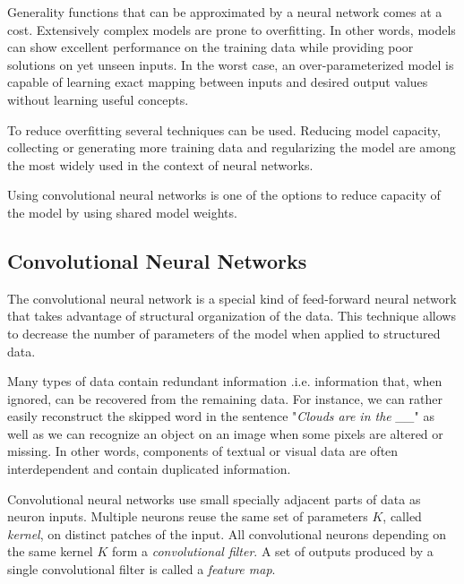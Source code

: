 Generality functions that can be approximated by a neural network comes at a cost.
Extensively complex models are prone to overfitting. In other words, models can show excellent performance on the training data while providing poor solutions on yet unseen inputs. In the worst case, an over-parameterized model is capable of learning exact mapping between inputs and desired output values without learning useful concepts.

To reduce overfitting several techniques can be used. Reducing model capacity, collecting or generating more training data and regularizing the model are among the most widely used in the context of neural networks.

Using convolutional neural networks is one of the options to reduce capacity of the model by using shared model weights.




\subsection{Convolutional Neural Networks}
\label{ch:cnn}

The convolutional neural network is a special kind of feed-forward neural network that takes advantage of structural organization of the data. This technique allows to decrease the number of parameters of the model when applied to structured data.

Many types of data contain redundant information .i.e. information that, when ignored, can be recovered from the remaining data.
For instance, we can rather easily reconstruct the skipped word in the sentence "\textit{Clouds are in the \_\_}" as well as we can recognize an object on an image when some pixels are altered or missing.
In other words, components of textual or visual data are often interdependent and contain duplicated information.

Convolutional neural networks use small specially adjacent parts of data as neuron inputs. Multiple neurons reuse the same set of parameters $K$, called \textit{kernel}, on distinct patches of the input. All convolutional neurons depending on the same kernel $K$ form a \textit{convolutional filter}. A set of outputs produced by a single convolutional filter is called a \textit{feature map}.



